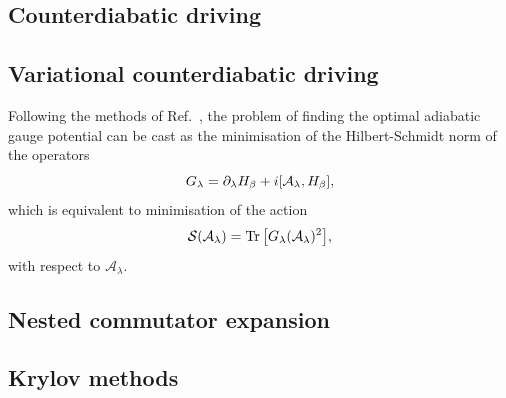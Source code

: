    \subsection{Counterdiabatic driving}
    \subsection{Variational counterdiabatic driving}
    Following the methods of Ref.~\cite{sels_minimizing_2017}, the problem of finding the optimal adiabatic gauge potential can be cast as the minimisation of the Hilbert-Schmidt norm of the operators
    \begin{equation}\label{eq:Goperator}
     G_{\lambda}= \partial_{\lambda}H_\beta + i\comm{\mathcal{A}_\lambda}{H_\beta},
    \end{equation}
    which is equivalent to minimisation of the action
    \begin{equation}\label{eq:actionCD}
    \mathcal{S}(\mathcal{A}_{\lambda}) = \Trace{\left[G_{\lambda}(\mathcal{A}_{\lambda})^2\right]},
    \end{equation}
    with respect to $\mathcal{A}_{\lambda}$.
    \subsection{Nested commutator expansion}
    \subsection{Krylov methods}
